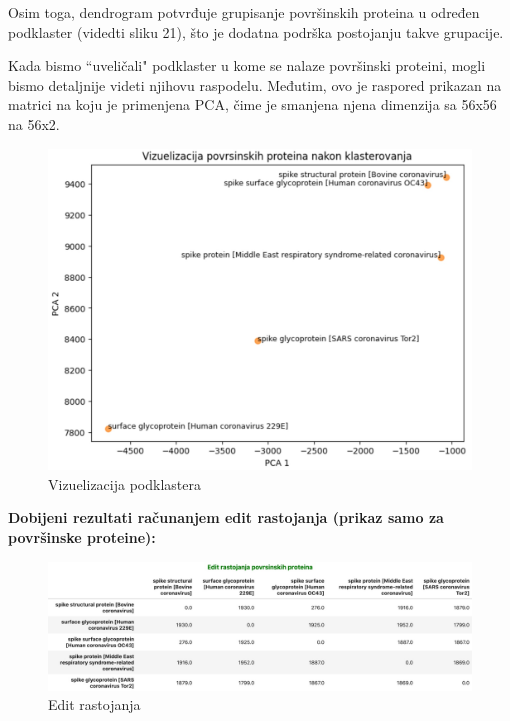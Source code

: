 \documentclass[a4paper,12pt]{article}
\begin{document}
\smallskip
Osim toga, dendrogram potvrđuje grupisanje površinskih proteina u određen podklaster (videdti sliku 21), što je dodatna podrška postojanju takve grupacije. 


\bigskip
Kada bismo “uveličali" podklaster u kome se nalaze površinski proteini, mogli bismo detaljnije videti njihovu raspodelu. Međutim, ovo je raspored prikazan na matrici na koju je primenjena PCA, čime je smanjena njena dimenzija sa 56x56 na 56x2.

\newpage
\begin{figure}[h!]
  \centering
  \includegraphics[width=1\textwidth]{slika24.jpeg}
  \caption{Vizuelizacija podklastera}
  \label{fig:my_label}
\end{figure}

\bigskip
\noindent
\textbf{Dobijeni rezultati računanjem edit rastojanja (prikaz samo za površinske proteine):}

\bigskip
\begin{figure}[h!]
  \centering
  \includegraphics[width=1\textwidth]{slika25.jpeg}
  \caption{Edit rastojanja}
  \label{fig:my_label}
\end{figure}

\newpage
\end{document}
